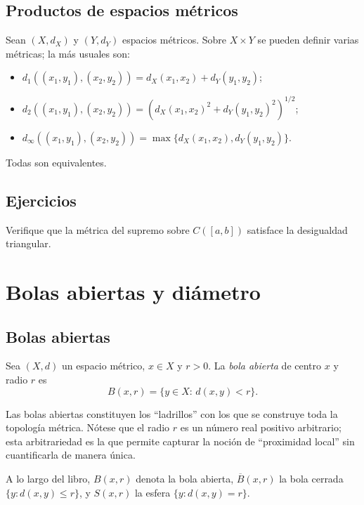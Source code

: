 \subsection{Productos de espacios métricos}

\begin{definition}
\label{def:producto-metrico}
Sean $(X,d_X)$ y $(Y,d_Y)$ espacios métricos. Sobre $X\times Y$ se pueden definir varias métricas; la más usuales son:
\begin{itemize}
  \item $d_1((x_1,y_1),(x_2,y_2))=d_X(x_1,x_2)+d_Y(y_1,y_2)$;
  \item $d_2((x_1,y_1),(x_2,y_2))=(d_X(x_1,x_2)^2+d_Y(y_1,y_2)^2)^{1/2}$;
  \item $d_\infty((x_1,y_1),(x_2,y_2))=\max\{d_X(x_1,x_2),d_Y(y_1,y_2)\}$.
\end{itemize}
Todas son equivalentes.
\end{definition}

\subsection{Ejercicios}

\begin{exercise}
Verifique que la métrica del supremo sobre $C([a,b])$ satisface la desigualdad triangular.
\end{exercise}

\section{Bolas abiertas y diámetro}

\subsection{Bolas abiertas}

\begin{definition}
\label{def:bola-abierta}
Sea $(X,d)$ un espacio métrico, $x\in X$ y $r>0$. La \emph{bola abierta} de centro $x$ y radio $r$ es
\[
  B(x,r)=\{y\in X:\,d(x,y)<r\}.
\]
\end{definition}

Las bolas abiertas constituyen los ``ladrillos'' con los que se construye toda la topología métrica. Nótese que el radio $r$ es un número real positivo arbitrario; esta arbitrariedad es la que permite capturar la noción de ``proximidad local'' sin cuantificarla de manera única.

\begin{notation}
\label{not:bolas}
A lo largo del libro, $B(x,r)$ denota la bola abierta, $\overline{B}(x,r)$ la bola cerrada $\{y:d(x,y)\leq r\}$, y $S(x,r)$ la esfera $\{y:d(x,y)=r\}$.
\end{notation}

